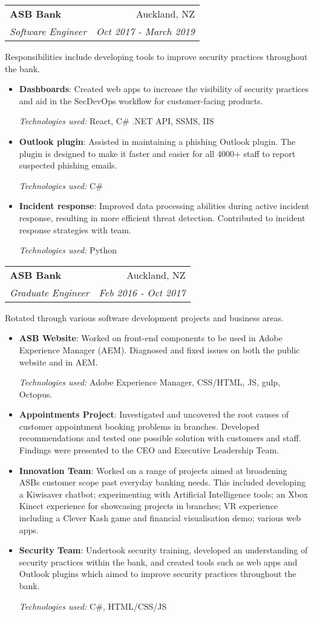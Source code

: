 \documentclass[letterpaper,10pt]{article}
\makeatletter
\newcommand{\resumeItem}[2]{
  \item\small{
    \textbf{#1}{: #2 \vspace{-2pt}}
  }
}
\newcommand{\resumeSubheading}[4]{
  \vspace{-1pt}\item
    \begin{tabular*}{0.97\textwidth}{l@{\extracolsep{\fill}}r}
      \textbf{#1} & #2 \\
      \textit{\small#3} & \textit{\small #4} \\
    \end{tabular*}\vspace{-2pt}
}
\newcommand{\resumeItemListStart}{\begin{itemize} \vspace{-3pt}}
\newcommand{\resumeItemListEnd}{\end{itemize} \vspace{-1pt}}
\makeatother
\begin{document}
    \resumeSubheading
      {ASB Bank}{Auckland, NZ}
      {Software Engineer}{Oct 2017 - March 2019}
      \par{Responsibilities include developing tools to improve security practices throughout the bank.}
      \resumeItemListStart
        \resumeItem{Dashboards}
          {Created web apps to increase the visibility of security practices and aid in the SecDevOps workflow for customer-facing products.}
         {\textit{Technologies used:} React, C\# .NET API, SSMS, IIS}
          \resumeItem{Outlook plugin}
          {Assisted in maintaining a phishing Outlook plugin. The plugin is designed to make it faster and easier 				for all 4000+ staff to report suspected phishing emails.}
			{\textit{Technologies used:} C\#}
          \resumeItem{Incident response}
          {Improved data processing abilities during active incident response, resulting in more efficient threat detection. Contributed to incident response strategies with team.}
			{\textit{Technologies used: } Python}
      \resumeItemListEnd

      \resumeSubheading
      {ASB Bank}{Auckland, NZ}
      {Graduate Engineer}{Feb 2016 - Oct 2017}
      \par{Rotated through various software development projects and business areas.}
      \resumeItemListStart
        \resumeItem{ASB Website}
          {Worked on front-end components to be used in Adobe Experience Manager (AEM). Diagnosed and fixed issues on both the public website and in AEM.}
{\textit{Technologies used:} Adobe Experience Manager, CSS/HTML, JS, gulp, Octopus.}
        \resumeItem{Appointments Project}
          {Investigated and uncovered the root causes of customer appointment booking problems in branches. Developed recommendations and tested one possible solution with customers and staff. Findings were presented to the CEO and Executive Leadership Team.}
          \resumeItem{Innovation Team}
          {Worked on a range of projects aimed at broadening ASBs customer scope past everyday banking needs. This included developing a Kiwisaver chatbot; experimenting with Artificial Intelligence tools; an Xbox Kinect experience for showcasing projects in branches; VR experience including a Clever Kash game and financial visualisation demo; various web apps.}
          \resumeItem{Security Team}
          {Undertook security training, developed an understanding of security practices within the bank, and created tools such as web apps and Outlook plugins which aimed to improve security practices throughout the bank.}
{\textit{Technologies used:} C\#, HTML/CSS/JS}
      \resumeItemListEnd
      
\end{document}
